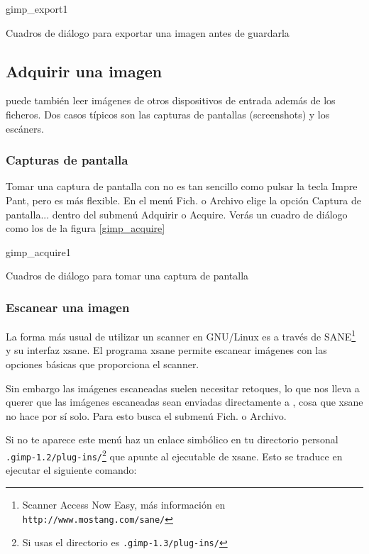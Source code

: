 \begin{figura}{gimp_export}{1}
\caption{Cuadros de diálogo para exportar una imagen antes de guardarla}
\end{figura}

\subsection{Adquirir una imagen}

\gimp puede  también leer  imágenes de  otros dispositivos  de entrada
además  de  los  ficheros.  Dos  casos típicos  son  las  capturas  de
pantallas (screenshots) y los escáners.

\subsubsection{Capturas de pantalla}

Tomar una captura de pantalla con \gimp no es tan sencillo como pulsar
la  tecla {\sf  Impre Pant},  pero es  más flexible.  En el  menú {\sf
Fich.} o  {\sf Archivo} elige  la opción {\sf Captura  de pantalla...}
dentro del submenú {\sf Adquirir} o  {\sf Acquire}. Verás un cuadro de
diálogo como los de la figura \ref{gimp_acquire}

\begin{figura}{gimp_acquire}{1}
\caption{Cuadros de diálogo para tomar una captura de pantalla}
\end{figura}

\subsubsection{Escanear una imagen}

La forma  más usual de  utilizar un scanner  en GNU/Linux es  a través
de  SANE\footnote{Scanner Access  Now  Easy, más  información en  {\tt
http://www.mostang.com/sane/}} y su interfaz  {\sf xsane}. El programa
{\sf xsane}  permite escanear  imágenes con  las opciones  básicas que
proporciona el  scanner. 

Sin  embargo las  imágenes  escaneadas suelen  necesitar retoques,  lo
que  nos lleva  a querer  que  las imágenes  escaneadas sean  enviadas
directamente a \gimp,  cosa que {\sf xsane} no hace  por sí solo. Para
esto busca el  submenú {\sf Fich.} o {\sf Archivo}.

Si no  te aparece este menú  haz un enlace simbólico  en tu directorio
personal  {\tt  .gimp-1.2/plug-ins/}\footnote{Si  usas    el
directorio es  {\tt .gimp-1.3/plug-ins/}} que apunte  al ejecutable de
{\sf xsane}. Esto se traduce en ejecutar el siguiente comando:

